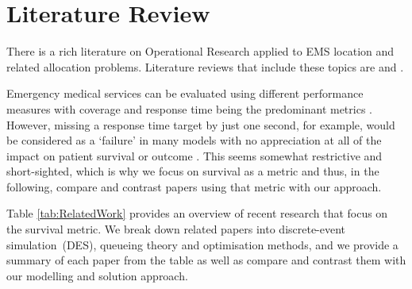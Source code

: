 \documentclass[preprint,12pt]{elsarticle}
\begin{document}
\section{Literature Review}\label{sec:litreview}

There is a rich literature on Operational Research applied to EMS location and related allocation problems. Literature reviews that include these topics are \citet{aringhieri2017emergency, belanger2019recent, farahani2019or, Li2011, Liu2021, reuter2017logistics} and  \citet{wang2021emergency}.

Emergency medical services can be evaluated using different performance measures with coverage and response time being the predominant metrics \cite{Mclay2010evaluating}. However, missing a response time target by just one second, for example, would be considered as a `failure' in many models with no appreciation at all of the impact on patient survival or outcome \cite{Mclay2010evaluating}. This seems somewhat restrictive and short-sighted, which is why we focus on survival as a metric and thus, in the following, compare and contrast papers using that metric with our approach.

Table \ref{tab:RelatedWork} provides an overview of recent research that focus on the survival metric. We break down related papers into discrete-event simulation~(DES), queueing theory and optimisation methods, and we provide a summary of each paper from the table as well as compare and contrast them with our modelling and solution approach.

\begin{table}[htbp]
\centering
\small
{}
\caption{Break down of related research that focuses on survival.\label{tab:RelatedWork}}
\end{table}
\end{document}
